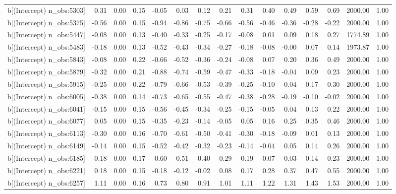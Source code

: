 \begin{table}[ht]
\begin{tabular}{rrrrrrrrrrrrrrr}
  b[(Intercept) n\_obs:5303] & 0.31 & 0.00 & 0.15 & -0.05 & 0.03 & 0.12 & 0.21 & 0.31 & 0.40 & 0.49 & 0.59 & 0.69 & 2000.00 & 1.00 \\ 
  b[(Intercept) n\_obs:5375] & -0.56 & 0.00 & 0.15 & -0.94 & -0.86 & -0.75 & -0.66 & -0.56 & -0.46 & -0.36 & -0.28 & -0.22 & 2000.00 & 1.00 \\ 
  b[(Intercept) n\_obs:5447] & -0.08 & 0.00 & 0.13 & -0.40 & -0.33 & -0.25 & -0.17 & -0.08 & 0.01 & 0.09 & 0.18 & 0.27 & 1774.89 & 1.00 \\ 
  b[(Intercept) n\_obs:5483] & -0.18 & 0.00 & 0.13 & -0.52 & -0.43 & -0.34 & -0.27 & -0.18 & -0.08 & -0.00 & 0.07 & 0.14 & 1973.87 & 1.00 \\ 
  b[(Intercept) n\_obs:5843] & -0.08 & 0.00 & 0.22 & -0.66 & -0.52 & -0.36 & -0.24 & -0.08 & 0.07 & 0.20 & 0.36 & 0.49 & 2000.00 & 1.00 \\ 
  b[(Intercept) n\_obs:5879] & -0.32 & 0.00 & 0.21 & -0.88 & -0.74 & -0.59 & -0.47 & -0.33 & -0.18 & -0.04 & 0.09 & 0.23 & 2000.00 & 1.00 \\ 
  b[(Intercept) n\_obs:5915] & -0.25 & 0.00 & 0.22 & -0.79 & -0.66 & -0.53 & -0.39 & -0.25 & -0.10 & 0.04 & 0.17 & 0.30 & 2000.00 & 1.00 \\ 
  b[(Intercept) n\_obs:6005] & -0.38 & 0.00 & 0.14 & -0.73 & -0.65 & -0.55 & -0.47 & -0.38 & -0.28 & -0.19 & -0.10 & -0.02 & 2000.00 & 1.00 \\ 
  b[(Intercept) n\_obs:6041] & -0.15 & 0.00 & 0.15 & -0.56 & -0.45 & -0.34 & -0.25 & -0.15 & -0.05 & 0.04 & 0.13 & 0.22 & 2000.00 & 1.00 \\ 
  b[(Intercept) n\_obs:6077] & 0.05 & 0.00 & 0.15 & -0.35 & -0.23 & -0.14 & -0.05 & 0.05 & 0.16 & 0.25 & 0.35 & 0.46 & 2000.00 & 1.00 \\ 
  b[(Intercept) n\_obs:6113] & -0.30 & 0.00 & 0.16 & -0.70 & -0.61 & -0.50 & -0.41 & -0.30 & -0.18 & -0.09 & 0.01 & 0.13 & 2000.00 & 1.00 \\ 
  b[(Intercept) n\_obs:6149] & -0.14 & 0.00 & 0.15 & -0.52 & -0.42 & -0.32 & -0.23 & -0.14 & -0.04 & 0.05 & 0.14 & 0.26 & 2000.00 & 1.00 \\ 
  b[(Intercept) n\_obs:6185] & -0.18 & 0.00 & 0.17 & -0.60 & -0.51 & -0.40 & -0.29 & -0.19 & -0.07 & 0.03 & 0.14 & 0.23 & 2000.00 & 1.00 \\ 
  b[(Intercept) n\_obs:6221] & 0.18 & 0.00 & 0.15 & -0.18 & -0.12 & -0.02 & 0.08 & 0.17 & 0.28 & 0.37 & 0.47 & 0.55 & 2000.00 & 1.00 \\ 
  b[(Intercept) n\_obs:6257] & 1.11 & 0.00 & 0.16 & 0.73 & 0.80 & 0.91 & 1.01 & 1.11 & 1.22 & 1.31 & 1.43 & 1.53 & 2000.00 & 1.00 \\ 

\end{tabular}
\end{table}

